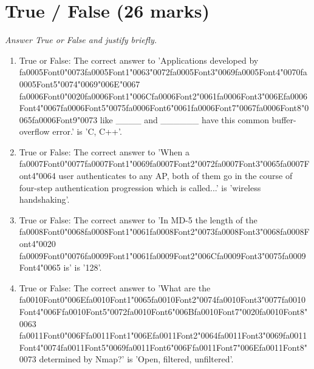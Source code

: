 \documentclass[12pt]{article}
\begin{document}
\section*{True / False (26 marks)}
\textit{Answer True or False and justify briefly.}
\begin{enumerate}[label=\arabic*.]
\item True or False: The correct answer to 'Applications developed by {\csname fa0005Font0\endcsname\char"0073}{\csname fa0005Font1\endcsname\char"0063}{\char"0072}{\csname fa0005Font3\endcsname\char"0069}{\csname fa0005Font4\endcsname\char"0070}{\csname fa0005Font5\endcsname\char"0074}{\char"0069}{\char"006E}{\char"0067} {\csname fa0006Font0\endcsname\char"0020}{\csname fa0006Font1\endcsname\char"006C}{\csname fa0006Font2\endcsname\char"0061}{\csname fa0006Font3\endcsname\char"006E}{\csname fa0006Font4\endcsname\char"0067}{\csname fa0006Font5\endcsname\char"0075}{\csname fa0006Font6\endcsname\char"0061}{\csname fa0006Font7\endcsname\char"0067}{\csname fa0006Font8\endcsname\char"0065}{\csname fa0006Font9\endcsname\char"0073} like \_\_\_\_ and \_\_\_\_\_\_ have this common buffer-overflow error.' is 'C, C++'.
\item True or False: The correct answer to 'When a {\csname fa0007Font0\endcsname\char"0077}{\csname fa0007Font1\endcsname\char"0069}{\csname fa0007Font2\endcsname\char"0072}{\csname fa0007Font3\endcsname\char"0065}{\csname fa0007Font4\endcsname\char"0064} user authenticates to any AP, both of them go in the course of four-step authentication progression which is called...' is 'wireless handshaking'.
\item True or False: The correct answer to 'In MD-5 the length of the {\csname fa0008Font0\endcsname\char"0068}{\csname fa0008Font1\endcsname\char"0061}{\csname fa0008Font2\endcsname\char"0073}{\csname fa0008Font3\endcsname\char"0068}{\csname fa0008Font4\endcsname\char"0020} {\csname fa0009Font0\endcsname\char"0076}{\csname fa0009Font1\endcsname\char"0061}{\csname fa0009Font2\endcsname\char"006C}{\csname fa0009Font3\endcsname\char"0075}{\csname fa0009Font4\endcsname\char"0065} is' is '128'.
\item True or False: The correct answer to 'What are the {\csname fa0010Font0\endcsname\char"006E}{\csname fa0010Font1\endcsname\char"0065}{\csname fa0010Font2\endcsname\char"0074}{\csname fa0010Font3\endcsname\char"0077}{\csname fa0010Font4\endcsname\char"006F}{\csname fa0010Font5\endcsname\char"0072}{\csname fa0010Font6\endcsname\char"006B}{\csname fa0010Font7\endcsname\char"0020}{\csname fa0010Font8\endcsname\char"0063} {\csname fa0011Font0\endcsname\char"006F}{\csname fa0011Font1\endcsname\char"006E}{\csname fa0011Font2\endcsname\char"0064}{\csname fa0011Font3\endcsname\char"0069}{\csname fa0011Font4\endcsname\char"0074}{\csname fa0011Font5\endcsname\char"0069}{\csname fa0011Font6\endcsname\char"006F}{\csname fa0011Font7\endcsname\char"006E}{\csname fa0011Font8\endcsname\char"0073} determined by Nmap?' is 'Open, filtered, unfiltered'.

\end{enumerate}
\end{document}
